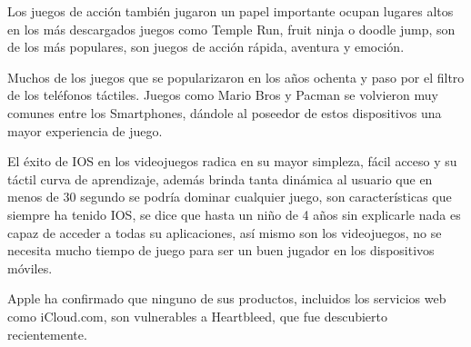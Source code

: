 Los juegos de acción también jugaron un papel importante
ocupan lugares altos en los más descargados juegos como
Temple Run, fruit ninja o doodle jump, son de los más
populares, son juegos de acción rápida, aventura y emoción.

Muchos de los juegos que se popularizaron en los años ochenta
y paso por el filtro de los teléfonos táctiles. Juegos como Mario
Bros y Pacman se volvieron muy comunes entre los
Smartphones, dándole al poseedor de estos dispositivos una
mayor experiencia de juego.

El éxito de IOS en los videojuegos radica en su mayor simpleza,
fácil acceso y su táctil curva de aprendizaje, además brinda
tanta dinámica al usuario que en menos de 30 segundo se podría
dominar cualquier juego, son características que siempre ha
tenido IOS, se dice que hasta un niño de 4 años sin explicarle
nada es capaz de acceder a todas su aplicaciones, así mismo son
los videojuegos, no se necesita mucho tiempo de juego para ser
un buen jugador en los dispositivos móviles.

Apple ha confirmado que ninguno de sus productos, incluidos los
servicios web como iCloud.com, son vulnerables a Heartbleed, que
fue descubierto recientemente.
